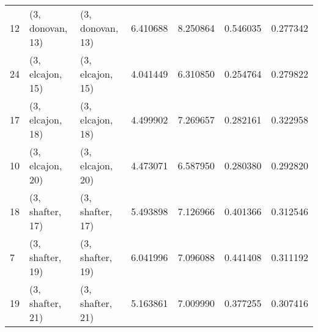 \begin{tabular}{lllrrrr}
12 &  (3, donovan, 13) &  (3, donovan, 13) &  6.410688 &  8.250864 &   0.546035 &  0.277342 \\
24 &  (3, elcajon, 15) &  (3, elcajon, 15) &  4.041449 &  6.310850 &   0.254764 &  0.279822 \\
17 &  (3, elcajon, 18) &  (3, elcajon, 18) &  4.499902 &  7.269657 &   0.282161 &  0.322958 \\
10 &  (3, elcajon, 20) &  (3, elcajon, 20) &  4.473071 &  6.587950 &   0.280380 &  0.292820 \\
18 &  (3, shafter, 17) &  (3, shafter, 17) &  5.493898 &  7.126966 &   0.401366 &  0.312546 \\
7  &  (3, shafter, 19) &  (3, shafter, 19) &  6.041996 &  7.096088 &   0.441408 &  0.311192 \\
19 &  (3, shafter, 21) &  (3, shafter, 21) &  5.163861 &  7.009990 &   0.377255 &  0.307416 \\
\bottomrule
\end{tabular}
